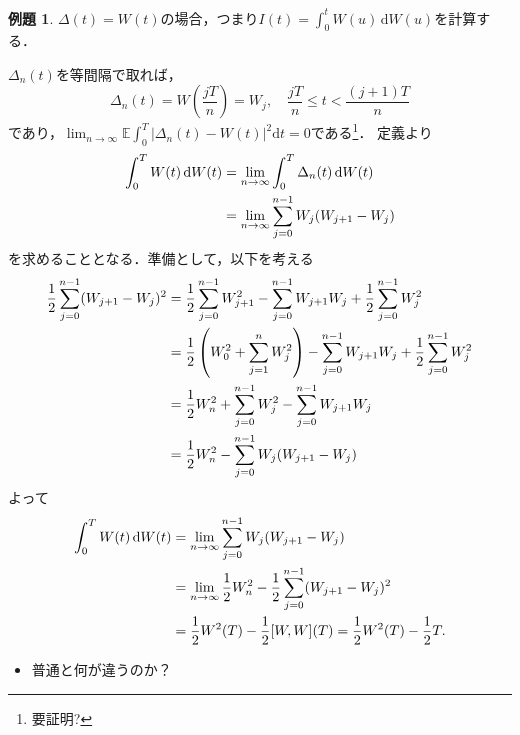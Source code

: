 \documentclass[a4paper, lualatex, ja=standard]{bxjsarticle}
\theoremstyle{definition}
\newtheorem{expl}[thm]{例題}
\newcommand{\E}{\mathbb{E}}
\newcommand{\diff}{\mathrm{d}}
\begin{document}
\begin{expl}
  $\Delta(t)=W(t)$の場合，つまり$I(t)=\int_0^tW(u)\,\diff W(u)$を計算する．

  $\Delta_n(t)$を等間隔で取れば，
  \begin{equation*}
    \Delta_n(t) = W\left(\frac{jT}{n}\right)=W_j,\quad \frac{jT}{n}\leq t < \frac{(j+1)T}{n}
  \end{equation*}
  であり，$\lim_{n\to\infty}\E\int_0^T|\Delta_n(t)-W(t)|^2\diff t=0$である\footnote{要証明?}．
  定義より
  \begin{align}
    \int_0^T W(t)\,\diff W(t) &= \lim_{n\to\infty}\int_0^T\Delta_n(t)\,\diff W(t)\notag\\
    &= \lim_{n\to\infty}\sum_{j=0}^{n-1}W_j(W_{j+1}-W_j)
  \end{align}
  を求めることとなる．準備として，以下を考える
  \begin{align}
    \frac{1}{2}\sum_{j=0}^{n-1}(W_{j+1}-W_j)^2
    &= \frac{1}{2}\sum_{j=0}^{n-1}W_{j+1}^2-\sum_{j=0}^{n-1}W_{j+1}W_j+\frac{1}{2}\sum_{j=0}^{n-1}W_j^2\notag\\
    &= \frac{1}{2} \left(W_0^2+\sum_{j=1}^{n}W_j^2\right) - \sum_{j=0}^{n-1}W_{j+1}W_j + \frac{1}{2} \sum_{j=0}^{n-1}W_j^2\notag\\
    &= \frac{1}{2}W_n^2 + \sum_{j=0}^{n-1}W_j^2 - \sum_{j=0}^{n-1}W_{j+1}W_j\notag\\
    &= \frac{1}{2}W_n^2 - \sum_{j=0}^{n-1}W_j(W_{j+1}-W_j)
  \end{align}
  よって
  \begin{align}
    \int_0^TW(t)\,\diff W(t) &= \lim_{n\to\infty}\sum_{j=0}^{n-1}W_j(W_{j+1}-W_j)\notag\\
    &= \lim_{n\to\infty}\frac{1}{2} W_n^2 - \frac{1}{2}\sum_{j=0}^{n-1}(W_{j+1}-W_j)^2\notag\\
    &= \frac{1}{2} W^2(T) - \frac{1}{2}[W,W](T) = \frac{1}{2}W^2(T) - \frac{1}{2}T.
  \end{align}

  \begin{itemize}
    \item 普通と何が違うのか？
    

\end{itemize}
\end{expl}
\end{document}
